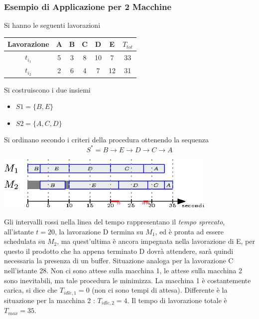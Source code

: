 \documentclass[10pt, letterpaper]{report}
\begin{document}
\subsubsection{Esempio di Applicazione per 2 Macchine}
Si hanno le seguenti lavorazioni \begin{center}
    \begin{tabular}{|c|c|c|c|c|c|c|}
        \hline
        Lavorazione & A & B & C & D  & E  & $T_{tot}$ \\ \hline
        $t_{i_1}$   & 5 & 3 & 8 & 10 & 7  & 33        \\ \hline
        $t_{i_2}$   & 2 & 6 & 4 & 7  & 12 & 31        \\ \hline
        \end{tabular}
\end{center}
Si costruiscono i due insiemi\begin{itemize}
    \item $S1=\{B, E\}$
    \item $S2=\{A, C, D\}$
\end{itemize}
Si ordinano secondo i criteri della procedura ottenendo la sequenza $$ S^* = 
B\rightarrow E\rightarrow D \rightarrow C \rightarrow A$$\begin{center}
    \includegraphics[width=0.8\textwidth ]{images/jhonson.eps}
\end{center}
Gli intervalli rossi nella linea del tempo rappresentano il \textit{tempo sprecato},
all'istante $t=20$, la lavorazione D termina su $M_1$, ed è pronta ad essere schedulata 
su $M_2$, ma quest'ultima è ancora impegnata nella lavorazione di E, per questo il prodotto 
che ha appena terminato D dovrà attendere, sarà quindi necessaria la presenza di un buffer. Situazione analoga 
per la lavorazione C nell'istante 28. \acc 
Non ci sono attese sulla macchina 1, le attese sulla macchina 2 sono inevitabili, ma tale procedura 
le minimizza. La macchina 1 è costantemente carica, si dice che $T_{idle,1}=0$ (non ci sono tempi di attesa). 
Differente è la situazione per la macchina 2 : $T_{idle,2}=4$. Il tempo di lavorazione totale è $T_{max}=35$.
\end{document}
